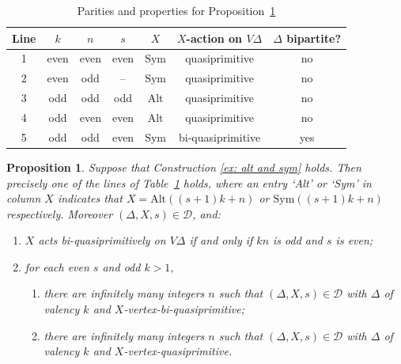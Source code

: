 \documentclass[11pt]{amsart}
\newtheorem{proposition}[theorem]{Proposition}
\newcommand\DD{{\mathscr{D}}}
\newcommand{\Sym}{\mathrm{Sym}}
\newcommand{\Alt}{\mathrm{Alt}}
\begin{document}
\begin{table}[]
    \centering
    \begin{tabular}{c|cccccc}
     Line  &\(k\)  &  \(n\)&\(s\)&\(X\)& $X$-action on \(V\Delta\)& $\Delta$ bipartite?\\  \hline
       1&even&even&even&\(\Sym\)&quasiprimitive&no\\
       2&even&odd&--&\(\Sym\)&quasiprimitive&no\\
       3& odd & odd&odd&\(\Alt\)& quasiprimitive & no \\
       4&odd & even & even &\(\Alt\)&quasiprimitive& no \\
       5& odd & odd &even &\(\Sym\)&bi-quasiprimitive& yes \\ \hline
    \end{tabular}
    \caption{Parities and properties for Proposition~\ref{ex: alt and sym 2}}
    \label{tab:placeholder}
\end{table}

\begin{proposition}\label{ex: alt and sym 2} 
   Suppose that Construction \ref{ex: alt and sym} holds. Then precisely one of the lines of Table~\ref{tab:placeholder} holds, where an entry `Alt' or `Sym' in column $X$ indicates that $X= \Alt((s+1)k+n)$ or $\Sym((s+1)k+n)$ respectively.  Moreover $(\Delta, X, s)\in\DD$, and:
       \begin{enumerate}
    \item \(X\) acts bi-quasiprimitively on \(V\Delta\) if and only if \(kn\) is odd and \(s\) is even; 
    \item for each even \(s\) and odd $k>1$, 
    \begin{enumerate}
        \item[(i)]     there are infinitely many integers \(n\) such that \((\Delta, X, s)\in\DD\) with $\Delta$ of valency $k$ and \(X\)-vertex-bi-quasiprimitive;
        \item[(ii)]     there are infinitely many integers \(n\) such that \((\Delta, X, s)\in\DD\) with $\Delta$ of valency $k$ and \(X\)-vertex-quasiprimitive.
    \end{enumerate}
    \end{enumerate}
\end{proposition}
\end{document}
